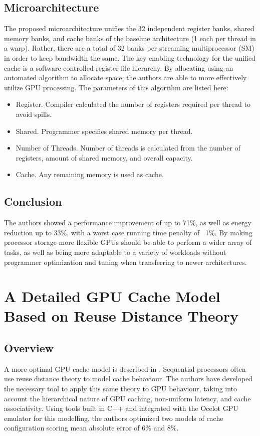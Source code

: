 \documentclass[conference]{IEEEtran}
\begin{document}
\subsection{Microarchitecture}
The proposed microarchitecture unifies the 32 independent register banks,
shared memory banks, and cache banks of the baseline architecture (1 each 
per thread in a warp). Rather, there are a total of 32 banks per streaming
multiprocessor (SM) in order to keep bandwidth the same. The key enabling
technology for the unified cache is a software controlled register file
hierarchy. By allocating using an automated algorithm to allocate space, 
the authors are able to more effectively utilize GPU processing. 
The parameters of this algorithm are listed here: 
\begin{itemize}
    \item Register. Compiler calculated the number of registers 
        required per thread to avoid spills.
    \item Shared. Programmer specifies shared memory per thread.
    \item Number of Threads. Number of threads is calculated from
        the number of registers, amount of shared memory, and overall 
        capacity.
    \item Cache. Any remaining memory is used as cache.
\end{itemize}

\subsection{Conclusion}
The authors showed a performance improvement of up to 71\%, as well as energy
reduction up to 33\%, with a worst case running time penalty of ~1\%.
By making processor storage more flexible GPUs should be able to perform a 
wider array of tasks, as well as being more adaptable to a variety of workloads
without programmer optimization and tuning when transferring to newer 
architectures.

\section{A Detailed GPU Cache Model Based on Reuse Distance Theory}
\subsection{Overview}
A more optimal GPU cache model is described in \cite{cache}. Sequential
processors often use reuse distance theory to model cache behaviour. The authors
have developed the necessary tool to apply this same theory to GPU behaviour,
taking into account the hierarchical nature of GPU caching, non-uniform latency,
and cache associativity. Using tools built in C++ and integrated with the 
Ocelot GPU emulator for this modelling, the authors optimized two models of
cache configuration scoring mean absolute error of 6\% and 8\%.
\end{document}
